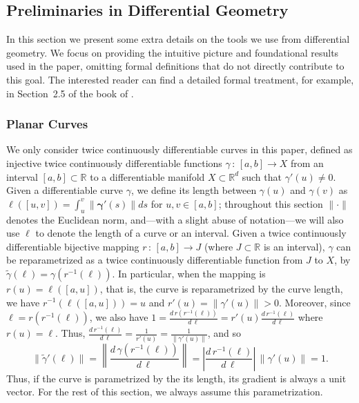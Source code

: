 \documentclass[english]{article}
\newcommand{\real}{\mathbb{R}}
\begin{document}
\subsection{Preliminaries in Differential Geometry}
\label{subsec:preliminariesDiffGeo}

In this section we present some extra details on the tools we use from differential geometry. We focus on providing the intuitive picture and foundational results used in the paper, omitting formal definitions 
that do not directly contribute to this goal. The interested reader can find a detailed formal treatment, for example, in Section~2.5 of the book of \citet{Sch14:ConvexBodies}. 

\subsubsection{Planar Curves}
\label{sec:app_planar}
We only consider twice continuously differentiable curves in this paper, defined as injective twice continuously differentiable functions $\gamma\,:\,  [a,b] \rightarrow X$ from an interval $[a,b]\subset \real$ to a differentiable manifold $X \subset \real^d$  such that $\gamma'(u) \neq 0$.  
Given a differentiable curve $\gamma$, we define its length between $\gamma(u)$ and $\gamma(v)$ as $\ell([u,v]) = \int_{u}^{v} \|\mathbf{\gamma}'(s)\| ds$ for $u,v \in [a,b]$; throughout this section $\|\cdot\|$ denotes the Euclidean norm, and---with a slight abuse of notation---we will also use $\ell$ to denote the length of a curve or an interval.
Given a twice continuously differentiable bijective mapping $r\,:\, [a,b] \rightarrow J$ (where $J \subset \real$ is an interval), $\gamma$ can be reparametrized as a twice continuously differentiable function from $J$ to $X$, by $\tilde{\gamma}(\ell) = \gamma(r^{-1}(\ell))$.
In particular, when the mapping is $r(u) = \ell([a,u])$, that is, the curve is reparametrized by the curve length, we have $r^{-1}(\ell([a,u]))=u$ and $r'(u) = \|\gamma'(u)\| >0$. 
Moreover, since $\ell = r(r^{-1}(\ell))$, we also have $1 = \frac{d\, r(r^{-1}(\ell))}{d\, \ell} = r'(u)\frac{d\, r^{-1}(\ell)}{d\, \ell}$
where $r(u) = \ell$. Thus, $\frac{d\, r^{-1}(\ell)}{d\, \ell} = \frac{1}{r'(u)} = \frac{1}{\|\gamma'(u)\|}$, and so
\[
\|\tilde{\gamma}'(\ell)\| = \left\|\frac{d\, \gamma(r^{-1}(\ell))}{d\, \ell}\right\| =\left|\frac{d\, r^{-1}(\ell)}{d\, \ell}\right|\,  \left\|\gamma'(u)\right\| = 1.
\] 
Thus, if the curve is parametrized by the its length, its gradient is always a unit vector. For the rest of this section, we always assume this parametrization. %
\end{document}
